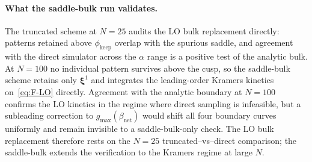 \documentclass[11pt]{article}
\newcommand{\bxi}{\boldsymbol{\xi}}
\newcommand{\Bnet}{\beta_{\mathrm{net}}}
\newcommand{\gmax}{g_{\max}}
\begin{document}
\paragraph{What the saddle-bulk run validates.}
The truncated scheme at $N = 25$ audits the LO bulk replacement directly:
patterns retained above $\phi_{\mathrm{keep}}$ overlap with the spurious
saddle, and agreement with the direct simulator across the $\alpha$ range
is a positive test of the analytic bulk.  At $N = 100$ no individual
pattern survives above the cusp, so the saddle-bulk scheme retains only
$\bxi^1$ and integrates the leading-order Kramers kinetics
on~\eqref{eq:F-LO} directly.  Agreement with the analytic boundary at
$N = 100$ confirms the LO kinetics in the regime where direct sampling
is infeasible, but a subleading correction to $\gmax(\Bnet)$ would shift
all four boundary curves uniformly and remain invisible to a
saddle-bulk-only check.  The LO bulk replacement therefore rests on the
$N = 25$ truncated--vs--direct comparison; the saddle-bulk extends the
verification to the Kramers regime at large $N$.



\end{document}
